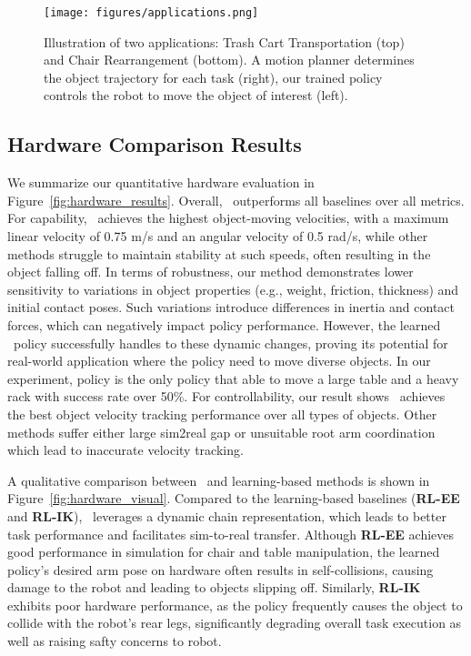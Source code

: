 \begin{figure*}[t]
 \centering
    \begin{minipage}[b]{.99\textwidth}
        \centering
        \texttt{[image: figures/applications.png]}
    \end{minipage}

\caption{Illustration of two applications: Trash Cart Transportation (top) and Chair Rearrangement (bottom). A motion planner determines the object trajectory for each task (right), our trained policy controls the robot to move the object of interest (left).}
\label{fig:applications}
 \vspace{-0.6cm}
\end{figure*}



\subsection{Hardware Comparison Results}
\label{sec:hardware_result}


We summarize our quantitative hardware evaluation in Figure~\ref{fig:hardware_results}. Overall, \method \ outperforms all baselines over all metrics. For capability, \method \ achieves the highest object-moving velocities, with a maximum linear velocity of 0.75 m/s and an angular velocity of 0.5 rad/s, while other methods struggle to maintain stability at such speeds, often resulting in the object falling off. In terms of robustness, our method demonstrates lower sensitivity to variations in object properties (e.g., weight, friction, thickness) and initial contact poses. Such variations introduce differences in inertia and contact forces, which can negatively impact policy performance. However, the learned \method \ policy successfully handles to these dynamic changes, proving its potential for real-world application where the policy need to move diverse objects.
In our experiment, \method policy is the only policy that able to move a large table and a heavy rack with success rate over 50\%. For controllability, our result shows \method \ achieves the best object velocity tracking performance over all types of objects. Other methods suffer either large sim2real gap or unsuitable root arm coordination which lead to inaccurate velocity tracking.

A qualitative comparison between \method \ and learning-based methods is shown in Figure~\ref{fig:hardware_visual}. Compared to the learning-based baselines (\textbf{RL-EE} and \textbf{RL-IK}), \method \ leverages a dynamic chain representation, which leads to better task performance and facilitates sim-to-real transfer.  Although \textbf{RL-EE} achieves good performance in simulation for chair and table manipulation, the learned policy's desired arm pose on hardware often results in self-collisions, causing damage to the robot and leading to objects slipping off. Similarly, \textbf{RL-IK} exhibits poor hardware performance, as the policy frequently causes the object to collide with the robot’s rear legs, significantly degrading overall task execution as well as raising safty concerns to robot.

